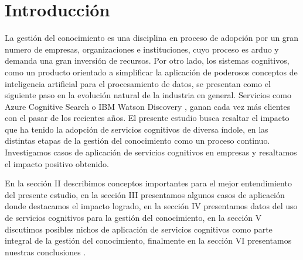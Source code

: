 \section{Introducción}

La gestión del conocimiento es una disciplina en proceso de adopción por un gran numero de
empresas, organizaciones e instituciones, cuyo proceso es arduo y demanda una gran inversión de
recursos. Por otro lado, los sistemas cognitivos, como un producto orientado a simplificar la
aplicación de poderosos conceptos de inteligencia artificial para el procesamiento de datos, se
presentan como el siguiente paso en la evolución natural de la industria en general. Servicios
como Azure Cognitive Search o IBM Watson Discovery \cite{Tadejko2020}, ganan cada vez
más clientes con el pasar de los recientes años. El presente estudio busca resaltar el impacto
que ha tenido la adopción de servicios cognitivos de diversa índole, en las distintas etapas de
la gestión del conocimiento como un proceso continuo. Investigamos casos de aplicación de
servicios cognitivos en empresas y resaltamos el impacto positivo obtenido.

En la sección II describimos conceptos importantes para el mejor entendimiento del presente
estudio, en la sección III presentamos algunos casos de aplicación donde destacamos el impacto
logrado, en la sección IV presentamos datos del uso de servicios cognitivos para la gestión del
conocimiento, en la sección V discutimos posibles nichos de aplicación de servicios cognitivos
como parte integral de la gestión del conocimiento, finalmente en la sección VI presentamos
nuestras conclusiones \cite{Ogiela2018}.